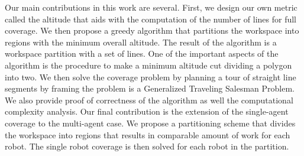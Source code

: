 \documentclass[../main.tex]{subfiles}
\begin{document}
Our main contributions in this work are several. First, we design our own metric called the altitude that aids with the computation of the number of lines for full coverage. We then propose a greedy algorithm that partitions the workspace into regions with the minimum overall altitude. The result of the algorithm is a workspace partition with a set of lines. One of the important aspects of the algorithm is the procedure to make a minimum altitude cut dividing a polygon into two. We then solve the coverage problem by planning a tour of straight line segments by framing the problem is a Generalized Traveling Salesman Problem. We also provide proof of correctness of the algorithm as well the computational complexity analysis. Our final contribution is the extension of the single-agent coverage to the multi-agent case. We propose a partitioning scheme that divides the workspace into regions that results in comparable amount of work for each robot. The single robot coverage is then solved for each robot in the partition. 
\end{document}
